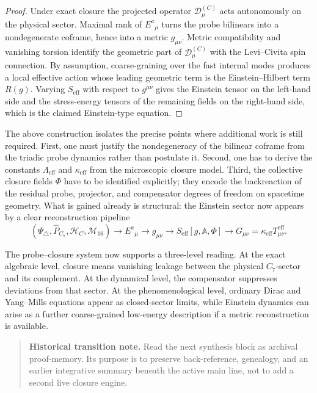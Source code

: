 \begin{proof}
Under exact closure the projected operator $\mathcal D^{(C)}_\mu$ acts
autonomously on the physical sector. Maximal rank of $E^a{}_{\mu}$ turns the
probe bilinears into a nondegenerate coframe, hence into a metric
$g_{\mu\nu}$. Metric compatibility and vanishing torsion identify the geometric
part of $\mathcal D^{(C)}_\mu$ with the Levi--Civita spin connection.
By assumption, coarse-graining over the fast internal modes produces a local
effective action whose leading geometric term is the Einstein--Hilbert term
$R(g)$. Varying $S_{\mathrm{eff}}$ with respect to $g^{\mu\nu}$ gives the Einstein
tensor on the left-hand side and the stress-energy tensors of the remaining
fields on the right-hand side, which is the claimed Einstein-type equation.
\end{proof}

\begin{remark}
The above construction isolates the precise points where additional work is
still required.
First, one must justify the nondegeneracy of the bilinear coframe from the
triadic probe dynamics rather than postulate it.
Second, one has to derive the constants $\Lambda_{\mathrm{eff}}$ and
$\kappa_{\mathrm{eff}}$ from the microscopic closure model.
Third, the collective closure fields $\Phi$ have to be identified explicitly;
they encode the backreaction of the residual probe, projector, and compensator
degrees of freedom on spacetime geometry.
What is gained already is structural: the Einstein sector now appears by a
clear reconstruction pipeline
\[
 (\Psi_\triangle,\hat P_{C_7},\mathcal H_C,\mathcal M_{16})
 \longrightarrow E^a{}_{\mu}
 \longrightarrow g_{\mu\nu}
 \longrightarrow S_{\mathrm{eff}}[g,\mathbb A,\Phi]
 \longrightarrow G_{\mu\nu}=\kappa_{\mathrm{eff}}T_{\mu\nu}^{\mathrm{eff}}.
\]
\end{remark}

\begin{remark}
The probe--closure system now supports a three-level reading.
At the exact algebraic level, closure means vanishing leakage between the
physical $C_7$-sector and its complement.
At the dynamical level, the compensator suppresses deviations from that
sector.
At the phenomenological level, ordinary Dirac and Yang--Mills equations
appear as closed-sector limits, while Einstein dynamics can arise as a
further coarse-grained low-energy description if a metric reconstruction is
available.
\end{remark}

\begin{quote}\small
\noindent\textbf{Historical transition note.} Read the next synthesis block as archival proof-memory. Its purpose is to preserve back-reference, genealogy, and an earlier integrative summary beneath the active main line, not to add a second live closure engine.
\end{quote}




